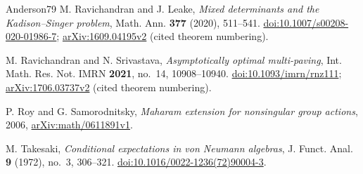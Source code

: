\begin{thebibliography}{Anderson79}
M. Ravichandran and J. Leake,
\emph{Mixed determinants and the Kadison--Singer problem},
Math. Ann. \textbf{377} (2020), 511--541.
\href{https://doi.org/10.1007/s00208-020-01986-7}{doi:10.1007/s00208-020-01986-7};
\href{https://arxiv.org/abs/1609.04195v2}{arXiv:1609.04195v2}
(cited theorem numbering).

M. Ravichandran and N. Srivastava,
\emph{Asymptotically optimal multi-paving},
Int. Math. Res. Not. IMRN \textbf{2021}, no.~14, 10908--10940.
\href{https://doi.org/10.1093/imrn/rnz111}{doi:10.1093/imrn/rnz111};
\href{https://arxiv.org/abs/1706.03737v2}{arXiv:1706.03737v2}
(cited theorem numbering).

P. Roy and G. Samorodnitsky,
\emph{Maharam extension for nonsingular group actions},
2006, \href{https://arxiv.org/abs/math/0611891v1}{arXiv:math/0611891v1}.

M. Takesaki,
\emph{Conditional expectations in von Neumann algebras},
J. Funct. Anal. \textbf{9} (1972), no.~3, 306--321.
\href{https://doi.org/10.1016/0022-1236(72)90004-3}{doi:10.1016/0022-1236(72)90004-3}.

\end{thebibliography}
